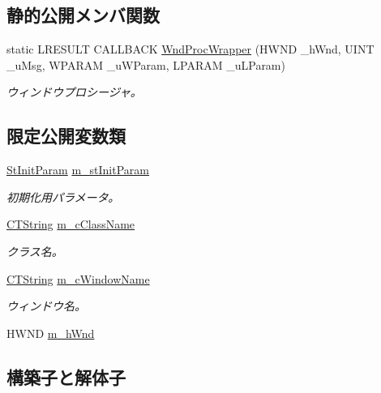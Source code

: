 \subsection*{静的公開メンバ関数}
\begin{DoxyCompactItemize}
\item 
static L\+R\+E\+S\+U\+L\+T C\+A\+L\+L\+B\+A\+C\+K \hyperlink{class_c_win_base_a6aeddce777aab9aa11122ad0a4c87287}{Wnd\+Proc\+Wrapper} (H\+W\+N\+D \+\_\+h\+Wnd, U\+I\+N\+T \+\_\+u\+Msg, W\+P\+A\+R\+A\+M \+\_\+u\+W\+Param, L\+P\+A\+R\+A\+M \+\_\+u\+L\+Param)
\begin{DoxyCompactList}\small\item\em ウィンドウプロシージャ。 \end{DoxyCompactList}\end{DoxyCompactItemize}
\subsection*{限定公開変数類}
\begin{DoxyCompactItemize}
\item 
\hyperlink{struct_c_win_base_1_1_st_init_param}{St\+Init\+Param} \hyperlink{class_c_win_base_abffc43f13e4878d093ffb0014cdad8a4}{m\+\_\+st\+Init\+Param}
\begin{DoxyCompactList}\small\item\em 初期化用パラメータ。 \end{DoxyCompactList}\item 
\hyperlink{_string_8h_a65b002fe7fe31f6e84dbb7e46907e031}{C\+T\+String} \hyperlink{class_c_win_base_a51dd5d7b97d383a2262d398926afd69f}{m\+\_\+c\+Class\+Name}
\begin{DoxyCompactList}\small\item\em クラス名。 \end{DoxyCompactList}\item 
\hyperlink{_string_8h_a65b002fe7fe31f6e84dbb7e46907e031}{C\+T\+String} \hyperlink{class_c_win_base_a167e6b8f4adb4f249e45147a84c47c9e}{m\+\_\+c\+Window\+Name}
\begin{DoxyCompactList}\small\item\em ウィンドウ名。 \end{DoxyCompactList}\item 
H\+W\+N\+D \hyperlink{class_c_win_base_acbf763d98e40063d0676af4279a619a3}{m\+\_\+h\+Wnd}
\end{DoxyCompactItemize}


\subsection{構築子と解体子}
\hypertarget{class_c_win_base_a61c9bced0a9d9cdcbbed44ad5d555a68}{}
